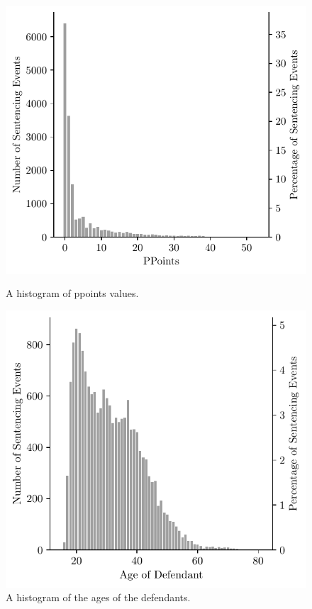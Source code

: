 \documentclass[11pt, oneside]{article}   	%
\theoremstyle{ModifiedStyle}
\begin{document}
%
\begin{figure}[h!]
	\centering
	\begin{minipage}{0.45\textwidth}
		\centering
		\hspace{-4mm}
		\includegraphics[scale=0.73]{Figures/PPoints_Histogram}
		\hspace{4mm}
		\vspace{-7mm}
		\caption{A histogram of ppoints values.}
		\label{Figure_Hester_Data_PPoints_Histogram}
	\end{minipage}
	\hspace*{5mm}
	\begin{minipage}{0.45\textwidth}
		\centering
		\hspace{-4mm}
		\includegraphics[scale=0.73]{Figures/Ages_Histogram}
		\hspace{4mm}
		\vspace{-7mm}
		\caption{A histogram of the ages of the defendants.}
		\label{Figure_Hester_Data_Age_Histogram}
	\end{minipage}
\end{figure}
\end{document}
